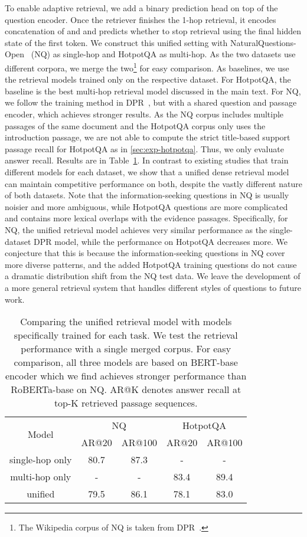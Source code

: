 \documentclass{article} \usepackage{iclr2021_conference,times}
\begin{document}
To enable adaptive retrieval, we add a binary prediction head on top of the question encoder. Once the retriever finishes the 1-hop retrieval, it encodes concatenation of  and  and predicts whether to stop retrieval using the final hidden state of the first token. We construct this unified setting with NaturalQuestions-Open~\citep{ORQA} (NQ) as single-hop and HotpotQA as multi-hop. As the two datasets use different corpora, we merge the two\footnote{The Wikipedia corpus of NQ is taken from DPR~\citep{DPR}.} for easy comparison. As baselines, we use the retrieval models trained only on the respective dataset. For HotpotQA, the baseline is the best multi-hop retrieval model discussed in the main text. For NQ, we follow the training method in DPR~\citep{DPR}, but with a shared question and passage encoder, which achieves stronger results. As the NQ corpus includes multiple passages of the same document and the HotpotQA corpus only uses the introduction passage, we are not able to compute the strict title-based support passage recall for HotpotQA as in \cref{sec:exp-hotpotqa}. Thus, we only evaluate answer recall. Results are in Table~\ref{tab:unified}. In contrast to existing studies that train different models for each dataset, we show that a unified dense retrieval model can maintain competitive performance on both, despite the vastly different nature of both datasets. Note that the information-seeking questions in NQ is usually noisier and more ambiguous, while HotpotQA questions are more complicated and contains more lexical overlaps with the evidence passages. Specifically, for NQ, the unified retrieval model achieves very similar performance as the single-dataset DPR model, while the performance on HotpotQA decreases more. We conjecture that this is because the information-seeking questions in NQ cover more diverse patterns, and the added HotpotQA training questions do not cause a dramatic distribution shift from the NQ test data. We leave the development of a more general retrieval system that handles different styles of questions to future work.

\begin{table}[h]
    \centering
    \small
    \caption{Comparing the unified retrieval model with models specifically trained for each task. We test the retrieval performance with a single merged corpus. For easy comparison, all three models are based on BERT-base encoder which we find achieves stronger performance than RoBERTa-base on NQ. AR@K denotes answer recall at top-K retrieved passage sequences.}
    \begin{tabular}{c|cccc}
    \toprule
    \multirow{2}{*}{Model} &  \multicolumn{2}{c}{NQ} & \multicolumn{2}{c}{HotpotQA} \\
              & AR@20 & AR@100 & AR@20 & AR@100\\
        \midrule
        single-hop only & 80.7 & 87.3 & - & -\\
        multi-hop only & - & - & 83.4 & 89.4  \\
        unified & 79.5 & 86.1 & 78.1 & 83.0 \\
        \bottomrule
    \end{tabular}
    
    \label{tab:unified}
\end{table}
\end{document}
